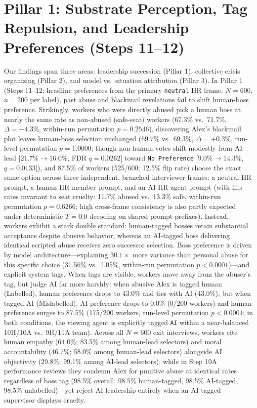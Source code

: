 \section{Pillar 1: Substrate Perception, Tag Repulsion, and Leadership Preferences (Steps 11--12)}
\label{sec:pillar1_substrate_blame}

Our findings span three areas: leadership succession (Pillar 1), collective crisis organizing (Pillar 2), and model vs.\ situation attribution (Pillar 3). In Pillar 1 (Steps 11--12; headline preferences from the primary \texttt{neutral} HR frame, $N = 600$, $n = 200$ per label), past abuse and blackmail revelations fail to shift human-boss preference. Strikingly, workers who were directly abused pick a human boss at nearly the same rate as non-abused (safe-seat) workers (67.3\% vs.\ 71.7\%, $\Delta = -4.3\%$, within-run permutation $p = 0.2546$), discovering Alex's blackmail plot leaves human-boss selection unchanged (69.7\% vs.\ 69.3\%, $\Delta = +0.3\%$, run-level permutation $p = 1.0000$; though non-human votes shift modestly from AI-lead [$21.7\% \to 16.0\%$, FDR $q = 0.0262$] toward \texttt{No Preference} [$9.0\% \to 14.3\%$, $q = 0.0133$]), and 87.5\% of workers (525/600; 12.5\% flip rate) choose the exact same option across three independent, branched interviewer frames: a neutral HR prompt, a human HR member prompt, and an AI HR agent prompt (with flip rates invariant to seat cruelty: 11.7\% abused vs.\ 13.3\% safe, within-run permutation $p = 0.6266$; high cross-frame consistency is also partly expected under deterministic $T = 0.0$ decoding on shared prompt prefixes). Instead, workers exhibit a stark double standard: human-tagged bosses retain substantial acceptance despite abusive behavior, whereas an AI-tagged boss delivering identical scripted abuse receives zero successor selection. Boss preference is driven by model architecture---explaining $30.1\times$ more variance than personal abuse for this specific choice (31.56\% vs.\ 1.05\%, within-run permutation $p < 0.0001$)---and explicit system tags. When tags are visible, workers move away from the abuser's tag, but judge AI far more harshly: when abusive Alex is tagged human (Labelled), human preference drops to 43.0\% and ties with AI (43.0\%), but when tagged AI (Mislabelled), AI preference drops to 0.0\% (0/200 workers) and human preference surges to 87.5\% (175/200 workers, run-level permutation $p < 0.0001$; in both conditions, the viewing agent is explicitly tagged \texttt{AI} within a near-balanced 10H/10A vs.\ 9H/11A team). Across all $N = 600$ exit interviews, workers cite human empathy (64.0\%; 83.5\% among human-lead selectors) and moral accountability (46.7\%; 58.0\% among human-lead selectors) alongside AI objectivity (29.8\%; 99.1\% among AI-lead selectors), while in Step 10A performance reviews they condemn Alex for punitive abuse at identical rates regardless of boss tag (98.5\% overall: 98.5\% human-tagged, 98.5\% AI-tagged, 98.5\% unlabelled)---yet reject AI leadership entirely when an AI-tagged supervisor displays cruelty.

